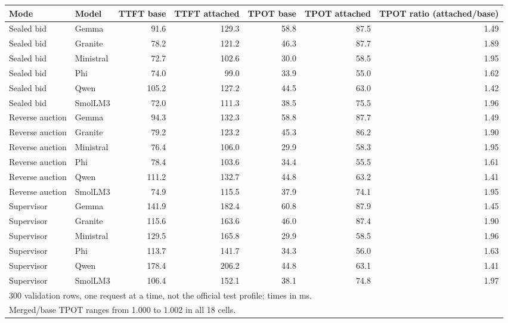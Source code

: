 \begin{tabular}{llrrrrr}
\toprule
Mode & Model & TTFT base & TTFT attached & TPOT base & TPOT attached & TPOT ratio (attached/base) \\
\midrule
Sealed bid & Gemma & 91.6 & 129.3 & 58.8 & 87.5 & 1.49 \\
Sealed bid & Granite & 78.2 & 121.2 & 46.3 & 87.7 & 1.89 \\
Sealed bid & Ministral & 72.7 & 102.6 & 30.0 & 58.5 & 1.95 \\
Sealed bid & Phi & 74.0 & 99.0 & 33.9 & 55.0 & 1.62 \\
Sealed bid & Qwen & 105.2 & 127.2 & 44.5 & 63.0 & 1.42 \\
Sealed bid & SmolLM3 & 72.0 & 111.3 & 38.5 & 75.5 & 1.96 \\
Reverse auction & Gemma & 94.3 & 132.3 & 58.8 & 87.7 & 1.49 \\
Reverse auction & Granite & 79.2 & 123.2 & 45.3 & 86.2 & 1.90 \\
Reverse auction & Ministral & 76.4 & 106.0 & 29.9 & 58.3 & 1.95 \\
Reverse auction & Phi & 78.4 & 103.6 & 34.4 & 55.5 & 1.61 \\
Reverse auction & Qwen & 111.2 & 132.7 & 44.8 & 63.2 & 1.41 \\
Reverse auction & SmolLM3 & 74.9 & 115.5 & 37.9 & 74.1 & 1.95 \\
Supervisor & Gemma & 141.9 & 182.4 & 60.8 & 87.9 & 1.45 \\
Supervisor & Granite & 115.6 & 163.6 & 46.0 & 87.4 & 1.90 \\
Supervisor & Ministral & 129.5 & 165.8 & 29.9 & 58.5 & 1.96 \\
Supervisor & Phi & 113.7 & 141.7 & 34.3 & 56.0 & 1.63 \\
Supervisor & Qwen & 178.4 & 206.2 & 44.8 & 63.1 & 1.41 \\
Supervisor & SmolLM3 & 106.4 & 152.1 & 38.1 & 74.8 & 1.97 \\
\bottomrule
\multicolumn{7}{l}{\footnotesize 300 validation rows, one request at a time, not the official test profile; times in ms.} \\
\multicolumn{7}{l}{\footnotesize Merged/base TPOT ranges from 1.000 to 1.002 in all 18 cells.} \\
\end{tabular}
